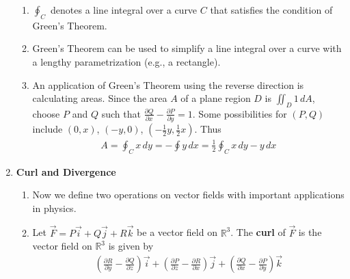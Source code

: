 \documentclass[10pt]{article}
\begin{document}
\begin{multicols}{2}
\begin{enumerate}
\begin{enumerate}
        \item $\oint_C$ denotes a line integral over a curve $C$ that satisfies the condition of Green’s Theorem.
        \item Green’s Theorem can be used to simplify a line integral over a curve with a lengthy parametrization (e.g., a rectangle). 
        \item An application of Green’s Theorem using the reverse direction is calculating areas. Since the area $A$ of a plane region $D$ is $\iint_D 1 \,dA$, choose $P$ and $Q$ such that $\frac{\partial Q}{\partial x} - \frac{\partial P}{\partial y}=1$. Some possibilities for $(P,Q)$ include $(0,x)$, $(-y,0)$, $(-\frac{1}{2}y, \frac{1}{2}x)$. Thus
        \begin{align*}
            A = \oint_C x \,dy = - \oint y \,dx = \frac{1}{2} \oint_C x \,dy - y \,dx
        \end{align*}
    \end{enumerate}
    
    \item \textbf{Curl and Divergence} 
    \begin{enumerate}
        \item Now we define two operations on vector fields with important applications in physics.
        \item Let $\vec{F} = P\vec{i} + Q\vec{j} + R\vec{k}$ be a vector field on $\mathbb{R}^3$. The \textbf{curl} of $\vec{F}$ is the vector field on $\mathbb{R}^3$ is given by 
        \begin{align*}
            \left( \frac{\partial R}{\partial y} - \frac{\partial Q}{\partial z} \right)\vec{i} + \left( \frac{\partial P}{\partial z} - \frac{\partial R}{\partial x} \right)\vec{j} + \left( \frac{\partial Q}{\partial x} - \frac{\partial P}{\partial y} \right)\vec{k}
        \end{align*}
        

\end{enumerate}
\end{enumerate}
\end{multicols}
\end{document}
